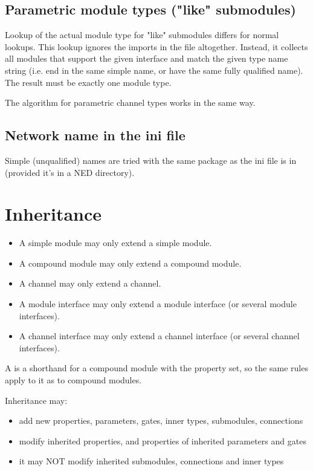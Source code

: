 \subsection{Parametric module types ("like" submodules)}

Lookup of the actual module type for "like" submodules differs for normal
lookups. This lookup ignores the imports in the file altogether.
Instead, it collects all modules that support the given interface
and match the given type name string (i.e. end in the same simple name,
or have the same fully qualified name). The result must be exactly
one module type.

The algorithm for parametric channel types works in the same way.


\subsection{Network name in the ini file}

Simple (unqualified) names are tried with the same package as the
ini file is in (provided it's in a NED directory).


\section{Inheritance}

\begin{itemize}
  \item A simple module may only extend a simple module.
  \item A compound module may only extend a compound module.
  \item A channel may only extend a channel.
  \item A module interface may only extend a module interface (or several module
        interfaces).
  \item A channel interface may only extend a channel interface (or several
        channel interfaces).
\end{itemize}

A  is a shorthand for a compound module with the 
property set, so the same rules apply to it as to compound modules.

Inheritance may:
\begin{itemize}
  \item add new properties, parameters, gates, inner types, submodules,
        connections
  \item modify inherited properties, and properties of inherited parameters and
        gates
  \item it may NOT modify inherited submodules, connections and inner types
\end{itemize}

